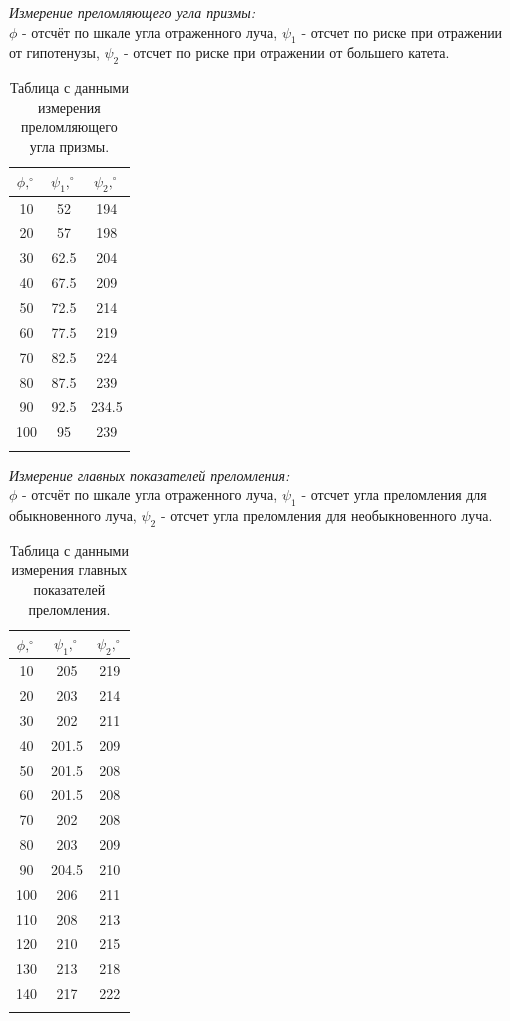 \documentclass[a4paper, 12pt]{article}%
\begin{document}
\newpage

	\textit{Измерение преломляющего угла призмы:}\\
	
	$\phi$ - отсчёт по шкале угла отраженного луча, $\psi_1$ - отсчет по риске при отражении от гипотенузы, $\psi_2$ - отсчет по риске при отражении от большего катета.
	
	
	\begin{longtable}{|c|c|c|}
		\hline
		$\phi, ^\circ$& $\psi_1, ^\circ$&  $\psi_2, ^\circ$ \\ \hline
		 10&   52& 194 \\ \hline
		 20&   57& 198 \\ \hline
		 30& 62.5& 204 \\ \hline
		 40& 67.5& 209 \\ \hline
		 50& 72.5& 214 \\ \hline
	 	 60& 77.5& 219 \\ \hline
		 70& 82.5& 224 \\ \hline
		 80& 87.5& 239 \\ \hline
		 90& 92.5& 234.5 \\ \hline
		100&  95& 239 \\ \hline
		\caption{Таблица с данными измерения преломляющего угла призмы.}
	\end{longtable}

	\textit{Измерение главных показателей преломления:}\\
	
	$\phi$ - отсчёт по шкале угла отраженного луча, $\psi_1$ - отсчет угла преломления для обыкновенного луча, $\psi_2$ - отсчет угла преломления для необыкновенного луча.
	
	\begin{longtable}{|c|c|c|}
		\hline
		$\phi, ^\circ$& $\psi_1, ^\circ$&  $\psi_2, ^\circ$ \\ \hline
		10&  205& 219 \\ \hline
		20&  203& 214 \\ \hline
		30& 202& 211 \\ \hline
		40& 201.5& 209 \\ \hline
		50& 201.5& 208 \\ \hline
		60& 201.5& 208 \\ \hline
		70& 202& 208 \\ \hline
		80& 203& 209 \\ \hline
		90& 204.5& 210 \\ \hline
		100&  206& 211 \\ \hline
		110& 208& 213 \\ \hline
		120& 210& 215 \\ \hline
		130& 213& 218 \\ \hline
		140&  217& 222 \\ \hline
		\caption{Таблица с данными измерения главных показателей преломления.}
	\end{longtable}
	
\end{document}
